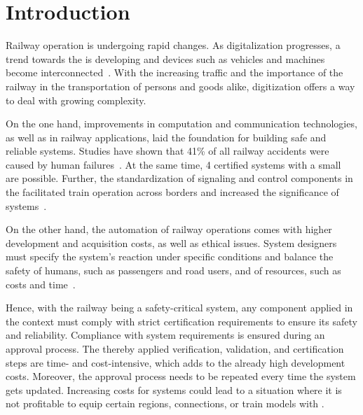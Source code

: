 \chapter{Introduction}


Railway operation is undergoing rapid changes.
%
As digitalization progresses, a trend towards the  is developing and devices such as vehicles and machines become interconnected~\cite{RailwayDigitalization}.
With the increasing traffic and the importance of the railway in the transportation of persons and goods alike, digitization offers a way to deal with growing complexity.

On the one hand, improvements in computation and communication technologies, as well as in railway applications, laid the foundation for building safe and reliable systems.
Studies have shown that 41\% of all railway accidents were caused by human failures~\cite{StudyRailwayAccidents}.
At the same time,  4 certified  systems with a small ~\cite{SallekSIL} are possible.
Further, the standardization of signaling and control components in the  facilitated train operation across borders and increased the significance of  systems~\cite{YIN2017RNDofATO}.

On the other hand, the automation of railway operations comes with higher development and acquisition costs, as well as ethical issues.
System designers must specify the system's reaction under specific conditions and balance the safety of humans, such as passengers and road users, and of resources, such as costs and time~\cite{EthicsInSafety}.

Hence, with the railway being a safety-critical system, any component applied in the  context must comply with strict certification requirements to ensure its safety and reliability.
Compliance with system requirements is ensured during an approval process.
The thereby applied verification, validation, and certification steps are time- and cost-intensive, which adds to the already high development costs.
Moreover, the approval process needs to be repeated every time the system gets updated.
Increasing costs for  systems could lead to a situation where it is not profitable to equip certain regions, connections, or train models with .
\\

